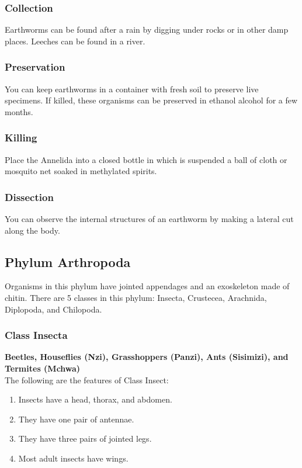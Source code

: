 \subsubsection{Collection}
Earthworms can be found after a rain by digging under rocks or in other damp places. Leeches can be found in a river.

\subsubsection{Preservation} 
You can keep earthworms in a container with fresh soil to preserve live specimens. If killed, these organisms can be preserved in ethanol alcohol for a few months. 

\subsubsection{Killing}
Place the Annelida into a closed bottle in which is suspended a ball of cloth or mosquito net soaked in methylated spirits.

\subsubsection{Dissection}
You can observe the internal structures of an earthworm by making a lateral cut along the body.

\subsection{Phylum Arthropoda}
Organisms in this phylum have jointed appendages and an exoskeleton made of chitin. There are 5 classes in this phylum: Insecta, Crustecea, Arachnida, Diplopoda, and Chilopoda.

\subsubsection{Class Insecta}
\textbf{Beetles, Houseflies (Nzi), Grasshoppers (Panzi), Ants (Sisimizi), and Termites (Mchwa)}\\
The following are the features of Class Insect:
\begin{enumerate}
\item{Insects have a head, thorax, and abdomen.}
\item{They have one pair of antennae.}
\item{They have three pairs of jointed legs.}
\item{Most adult insects have wings.}
\end{enumerate}

